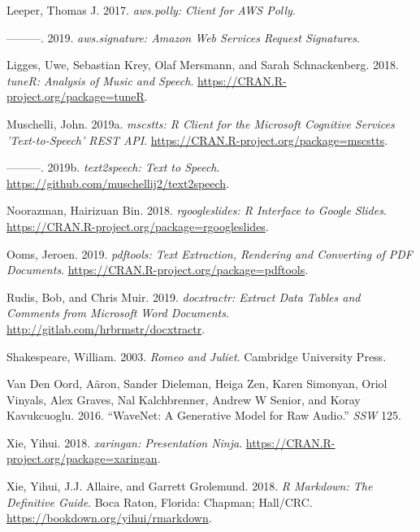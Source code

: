 \leavevmode\hypertarget{ref-aws.polly}{}%
Leeper, Thomas J. 2017. \emph{aws.polly: Client for AWS Polly}.

\leavevmode\hypertarget{ref-aws.signature}{}%
---------. 2019. \emph{aws.signature: Amazon Web Services Request
Signatures}.

\leavevmode\hypertarget{ref-tuneR}{}%
Ligges, Uwe, Sebastian Krey, Olaf Mersmann, and Sarah Schnackenberg.
2018. \emph{tuneR: Analysis of Music and Speech}.
\url{https://CRAN.R-project.org/package=tuneR}.

\leavevmode\hypertarget{ref-mscstts}{}%
Muschelli, John. 2019a. \emph{mscstts: R Client for the Microsoft
Cognitive Services 'Text-to-Speech' REST API}.
\url{https://CRAN.R-project.org/package=mscstts}.

\leavevmode\hypertarget{ref-text2speech}{}%
---------. 2019b. \emph{text2speech: Text to Speech}.
\url{https://github.com/muschellij2/text2speech}.

\leavevmode\hypertarget{ref-rgoogleslides}{}%
Noorazman, Hairizuan Bin. 2018. \emph{rgoogleslides: R Interface to
Google Slides}. \url{https://CRAN.R-project.org/package=rgoogleslides}.

\leavevmode\hypertarget{ref-pdftools}{}%
Ooms, Jeroen. 2019. \emph{pdftools: Text Extraction, Rendering and
Converting of PDF Documents}.
\url{https://CRAN.R-project.org/package=pdftools}.

\leavevmode\hypertarget{ref-docxtractr}{}%
Rudis, Bob, and Chris Muir. 2019. \emph{docxtractr: Extract Data Tables
and Comments from Microsoft Word Documents}.
\url{http://gitlab.com/hrbrmstr/docxtractr}.

\leavevmode\hypertarget{ref-shakespeare2003romeo}{}%
Shakespeare, William. 2003. \emph{Romeo and Juliet}. Cambridge
University Press.

\leavevmode\hypertarget{ref-van2016wavenet}{}%
Van Den Oord, Aäron, Sander Dieleman, Heiga Zen, Karen Simonyan, Oriol
Vinyals, Alex Graves, Nal Kalchbrenner, Andrew W Senior, and Koray
Kavukcuoglu. 2016. ``WaveNet: A Generative Model for Raw Audio.''
\emph{SSW} 125.

\leavevmode\hypertarget{ref-xaringan}{}%
Xie, Yihui. 2018. \emph{xaringan: Presentation Ninja}.
\url{https://CRAN.R-project.org/package=xaringan}.

\leavevmode\hypertarget{ref-rmarkdownbook}{}%
Xie, Yihui, J.J. Allaire, and Garrett Grolemund. 2018. \emph{R Markdown:
The Definitive Guide}. Boca Raton, Florida: Chapman; Hall/CRC.
\url{https://bookdown.org/yihui/rmarkdown}.

